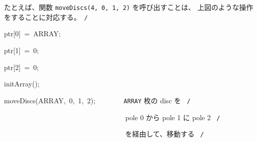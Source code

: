 \documentclass[a4paper,10pt]{article}
\def\mc{\relax}
\begin{document}
たとえば、関数 {\tt moveDiscs(4, 0, 1, 2)} を呼び出すことは、
上図のような操作をすることに対応する。\hfill \rm\mc \ {\tt *}{\tt /}
\tt\mc 

\noindent
\mbox{}\hfill

\noindent
\mbox{}\hfill

\noindent
\mbox{}ptr[0]{\tt\mc \ }={\tt\mc \ }ARRAY;

\noindent
\mbox{}ptr[1]{\tt\mc \ }={\tt\mc \ }0;

\noindent
\mbox{}ptr[2]{\tt\mc \ }={\tt\mc \ }0;

\noindent
\mbox{}\hfill

\noindent
\mbox{}initArray();

\noindent
\mbox{}moveDiscs(ARRAY,{\tt\mc \ }0,{\tt\mc \ }1,{\tt\mc \ }2);{\tt\mc \ }{\tt\mc \ }{\tt\mc \ }{\tt\mc \ }{\tt\mc \ }{\tt\mc \ }\rm\mc {\tt /}{\tt *}\  \ {\tt ARRAY} 枚の disc を \hfill \rm\mc \ {\tt *}{\tt /}
\tt\mc 

\noindent
\mbox{}{\tt\mc \ }{\tt\mc \ }{\tt\mc \ }{\tt\mc \ }{\tt\mc \ }{\tt\mc \ }{\tt\mc \ }{\tt\mc \ }{\tt\mc \ }{\tt\mc \ }{\tt\mc \ }{\tt\mc \ }{\tt\mc \ }{\tt\mc \ }{\tt\mc \ }{\tt\mc \ }{\tt\mc \ }{\tt\mc \ }{\tt\mc \ }{\tt\mc \ }{\tt\mc \ }{\tt\mc \ }{\tt\mc \ }{\tt\mc \ }{\tt\mc \ }{\tt\mc \ }{\tt\mc \ }{\tt\mc \ }{\tt\mc \ }{\tt\mc \ }{\tt\mc \ }{\tt\mc \ }\rm\mc {\tt /}{\tt *}\  \ pole 0 から pole 1 に pole 2 \hfill \rm\mc \ {\tt *}{\tt /}
\tt\mc 

\noindent
\mbox{}{\tt\mc \ }{\tt\mc \ }{\tt\mc \ }{\tt\mc \ }{\tt\mc \ }{\tt\mc \ }{\tt\mc \ }{\tt\mc \ }{\tt\mc \ }{\tt\mc \ }{\tt\mc \ }{\tt\mc \ }{\tt\mc \ }{\tt\mc \ }{\tt\mc \ }{\tt\mc \ }{\tt\mc \ }{\tt\mc \ }{\tt\mc \ }{\tt\mc \ }{\tt\mc \ }{\tt\mc \ }{\tt\mc \ }{\tt\mc \ }{\tt\mc \ }{\tt\mc \ }{\tt\mc \ }{\tt\mc \ }{\tt\mc \ }{\tt\mc \ }{\tt\mc \ }{\tt\mc \ }\rm\mc {\tt /}{\tt *}\  \ を経由して、移動する \hfill \rm\mc \ {\tt *}{\tt /}

\tt\mc 

\rm\mc
\end{document}
